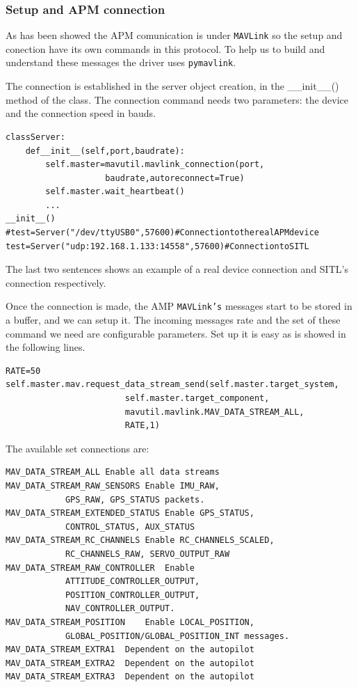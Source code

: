 \documentclass{llncs}
\begin{document}
\subsubsection{Setup and APM connection}

As has been showed the APM comunication is under \texttt{MAVLink} so the setup and conection have its own commands in this protocol.
To help us to build and understand these messages the driver uses \texttt{pymavlink}.

The connection is established in the server object creation, in the \_\_init\_\_() method of the class. The connection command needs two parameters: the device and the connection speed in bauds.
{\scriptsize
\begin{lstlisting}
classServer:
	def__init__(self,port,baudrate):
		self.master=mavutil.mavlink_connection(port,
					baudrate,autoreconnect=True)
		self.master.wait_heartbeat()
		...
__init__()
#test=Server("/dev/ttyUSB0",57600)#ConnectiontotherealAPMdevice
test=Server("udp:192.168.1.133:14558",57600)#ConnectiontoSITL
\end{lstlisting}}

The last two sentences shows an example of a real device connection and SITL's connection respectively.

Once the connection is made, the AMP \texttt{MAVLink's} messages start to be stored in a buffer, and we can setup it. The incoming messages rate and the set of these command we need are configurable parameters. Set up it is easy as is showed in the following lines.

{\scriptsize
\begin{lstlisting}
RATE=50
self.master.mav.request_data_stream_send(self.master.target_system,
						self.master.target_component,
						mavutil.mavlink.MAV_DATA_STREAM_ALL,
						RATE,1)
\end{lstlisting}}

The available set connections are:

\begin{verbatim}
MAV_DATA_STREAM_ALL	Enable all data streams
MAV_DATA_STREAM_RAW_SENSORS	Enable IMU_RAW, 
	        GPS_RAW, GPS_STATUS packets.
MAV_DATA_STREAM_EXTENDED_STATUS	Enable GPS_STATUS, 
	        CONTROL_STATUS, AUX_STATUS
MAV_DATA_STREAM_RC_CHANNELS	Enable RC_CHANNELS_SCALED,
	        RC_CHANNELS_RAW, SERVO_OUTPUT_RAW
MAV_DATA_STREAM_RAW_CONTROLLER	Enable 
	        ATTITUDE_CONTROLLER_OUTPUT, 
	        POSITION_CONTROLLER_OUTPUT, 
	        NAV_CONTROLLER_OUTPUT.
MAV_DATA_STREAM_POSITION	Enable LOCAL_POSITION, 
	        GLOBAL_POSITION/GLOBAL_POSITION_INT messages.
MAV_DATA_STREAM_EXTRA1	Dependent on the autopilot
MAV_DATA_STREAM_EXTRA2	Dependent on the autopilot
MAV_DATA_STREAM_EXTRA3	Dependent on the autopilot

\end{verbatim}
\end{document}
